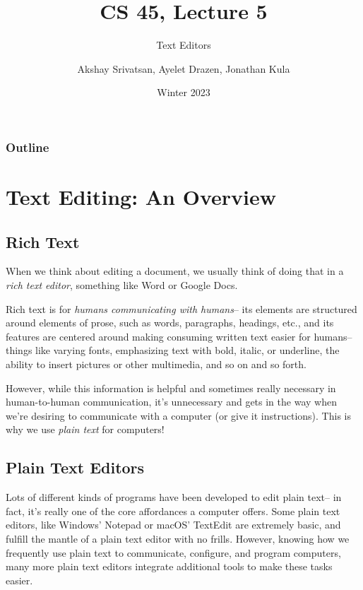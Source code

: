 \usepackage{shared/cs45}

\title{CS 45, Lecture 5}
\subtitle{Text Editors}
\date{Winter 2023}
\author{Akshay Srivatsan, Ayelet Drazen, Jonathan Kula}



\maketitle

\frame{\titlepage}

\begin{frame}
  \frametitle{Outline}
  \tableofcontents[hidesubsections]
\end{frame}

\section{Text Editing: An Overview}
\subsection{Rich Text}

When we think about editing a document, we usually think of doing that in 
a {\em rich text editor}, something like Word or Google Docs.

Rich text is for {\em humans communicating with humans}-- its elements
are structured around elements of prose, such as words, paragraphs,
headings, etc., and its features are centered around making consuming
written text easier for humans-- things like varying fonts, emphasizing
text with bold, italic, or underline, the ability to insert pictures
or other multimedia, and so on and so forth.

However, while this information is helpful and sometimes really necessary
in human-to-human communication, it's unnecessary and gets in the way when
we're desiring to communicate with a computer (or give it instructions).
This is why we use {\em plain text} for computers!

\subsection{Plain Text Editors}

Lots of different kinds of programs have been developed to edit plain text--
in fact, it's really one of the core affordances a computer offers. Some
plain text editors, like Windows' Notepad or macOS' TextEdit are extremely
basic, and fulfill the mantle of a plain text editor with no frills.
However, knowing how we frequently use plain text to communicate, configure,
and program computers, many more plain text editors integrate additional
tools to make these tasks easier.

